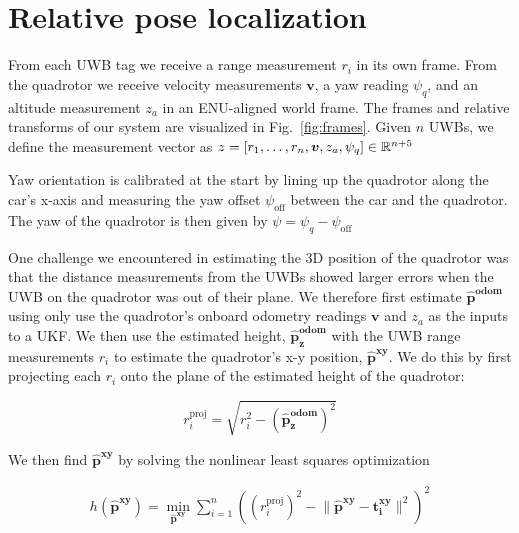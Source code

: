 
\section{Relative pose localization}

From each UWB tag we receive a range measurement $r_i$ in its own frame. 
From the quadrotor we receive velocity measurements $\bm{v}$, a yaw reading $\psi_q$,
and an altitude measurement $z_a$ in an ENU-aligned world frame. The frames and relative
transforms of our system are visualized in Fig.~\ref{fig:frames}.
Given $n$ UWBs, we define the measurement vector as $z = [r_1, \dots, r_n, \bm{v}, z_a, \psi_q] \in \mathbb{R}^{n+5}$



Yaw orientation is calibrated at the start by lining up the quadrotor along the car's x-axis
and measuring the yaw offset $\psi_{\text{off}}$ between the car and the quadrotor.
The yaw of the quadrotor is then given by $\psi = \psi_q - \psi_{\text{off}}$

One challenge we encountered in estimating the 3D position of the quadrotor was that
the distance measurements from the UWBs showed larger errors when the UWB on the quadrotor was out of their plane.
We therefore first estimate $\bm{\hat{p}^{\text{odom}}}$ using only use the quadrotor's onboard 
odometry readings $\bm{v}$ and $z_a$ as the inputs to a UKF. We then use the estimated
height, $\bm{\hat{p}_z^{\text{odom}}}$ with the UWB range
measurements $r_i$ to estimate the quadrotor's x-y position, $\bm{\hat{p}^{xy}}$.
We do this by first projecting each $r_i$ onto the plane of the estimated height of the quadrotor:

$$
   r_i^{\text{proj}} = \sqrt{r_i^2 - (\bm{\hat{p}_z^{\text{odom}}})^2}
$$

We then find $\bm{\hat{p}^{xy}}$ by solving the nonlinear least squares optimization

\begin{align*} 
    h(\bm{\hat{p}^{xy}}) = \min_{{\bm{\hat{p}^{xy}}}} \sum_{i=1}^{n} ((r_{i}^{\text{proj}})^2 - \lVert \bm{\hat{p}^{xy}} - \bm{t_i^{xy}}\rVert^2)^2
\end{align*}

